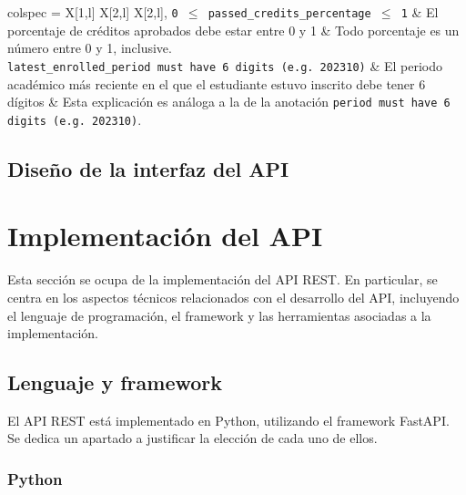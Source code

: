 \begin{longtblr}[
		caption = {Anotaciones del diagrama de clases y su significado},
		label = {tab:anotaciones},
	]{
		colspec = {X[1,l] X[2,l] X[2,l]},
	}
	\texttt{0 \ensuremath{\leq} passed\_credits\_percentage \ensuremath{\leq} 1} & El porcentaje de créditos aprobados debe estar entre 0 y 1                                                                 & Todo porcentaje es un número entre 0 y 1, inclusive.                                                                                                                                                                                                               \\
	\texttt{latest\_enrolled\_period must have 6 digits (e.g. 202310)}           & El periodo académico más reciente en el que el estudiante estuvo inscrito debe tener 6 dígitos                             & Esta explicación es análoga a la de la anotación \texttt{period must have 6 digits (e.g. 202310)}.                                                                                                                                                                 \\
	\hline
\end{longtblr}

\subsection{Diseño de la interfaz del \gls{API}}


\section{Implementación del API}

Esta sección se ocupa de la implementación del \gls{API REST}. En particular, se centra en los aspectos técnicos relacionados con el desarrollo del \gls{API}, incluyendo el lenguaje de programación, el framework y las herramientas asociadas a la implementación.

\subsection{Lenguaje y framework}

El \gls{API REST} está implementado en \gls{Python}, utilizando el framework \gls{FastAPI}. Se dedica un apartado a justificar la elección de cada uno de ellos.

\subsubsection{Python}

